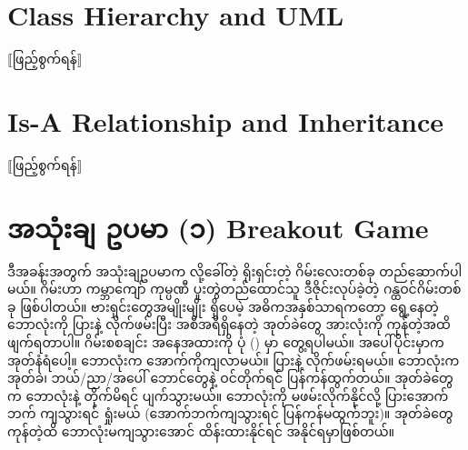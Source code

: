 \section{Class Hierarchy and UML}
$\big\llbracket$ဖြည့်စွက်ရန်$\big\rrbracket$
\section{Is-A Relationship and Inheritance}
$\big\llbracket$ဖြည့်စွက်ရန်$\big\rrbracket$

\section{အသုံးချ ဥပမာ (၁) Breakout Game}
ဒီအခန်းအတွက် အသုံးချဥပမာက  လို့ခေါ်တဲ့ ရိုးရှင်းတဲ့ ဂိမ်းလေးတစ်ခု တည်ဆောက်ပါမယ်။  ဂိမ်းဟာ ကမ္ဘာကျော်  ကုမ္ပဏီ ပူးတွဲတည်ထောင်သူ  ဒီဇိုင်းလုပ်ခဲ့တဲ့ ဂန္ထဝင်ဂိမ်းတစ်ခု ဖြစ်ပါတယ်။ ဗားရှင်းတွေအမျိုးမျိုး ရှိပေမဲ့ အဓိကအနှစ်သာရကတော့ ရွေ့နေတဲ့  ဘောလုံးကို  ပြားနဲ့ လိုက်ဖမ်းပြီး အစီအရီရှိနေတဲ့ အုတ်ခဲတွေ အားလုံးကို ကုန်တဲ့အထိ ဖျက်ရတာပါ။  ဂိမ်းစစချင်း အနေအထားကို ပုံ  (\fRefNo{\ref{fig:breakout}}) မှာ တွေ့ရပါမယ်။ အပေါ်ပိုင်းမှာက အုတ်နံရံပေါ့။ ဘောလုံးက အောက်ကိုကျလာမယ်။  ပြားနဲ့ လိုက်ဖမ်းရမယ်။ ဘောလုံးက \fEn{,} အုတ်ခဲ၊ ဘယ်/ညာ/အပေါ် ဘောင်တွေနဲ့ ဝင်တိုက်ရင် ပြန်ကန်ထွက်တယ်။ အုတ်ခဲတွေက ဘောလုံးနဲ့ တိုက်မိရင် ပျက်သွားမယ်။ ဘောလုံးကို မဖမ်းလိုက်နိုင်လို့  ပြားအောက်ဘက် ကျသွားရင် ရှုံးမယ် (အောက်ဘက်ကျသွားရင် ပြန်ကန်မထွက်ဘူး)။ အုတ်ခဲတွေ ကုန်တဲ့ထိ ဘောလုံးမကျသွားအောင် ထိန်းထားနိုင်ရင် အနိုင်ရမှာဖြစ်တယ်။ 

%
\begin{figure}[tbh!]
\caption{} 
\label{fig:breakout}
\end{figure}
%

